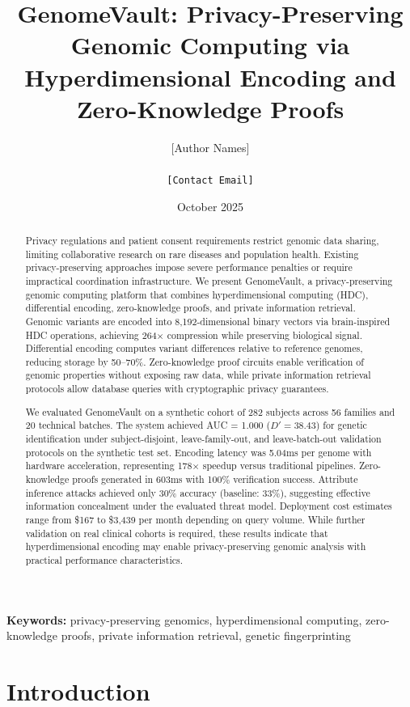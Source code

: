 \documentclass[11pt,letterpaper]{article}
\title{GenomeVault: Privacy-Preserving Genomic Computing via Hyperdimensional Encoding and Zero-Knowledge Proofs}
\author{
    [Author Names]\\
    [Institution Names]\\
    \texttt{[Contact Email]}
}
\date{October 2025}
\begin{document}
\maketitle

\begin{abstract}
Privacy regulations and patient consent requirements restrict genomic data sharing, limiting collaborative research on rare diseases and population health. Existing privacy-preserving approaches impose severe performance penalties or require impractical coordination infrastructure. We present GenomeVault, a privacy-preserving genomic computing platform that combines hyperdimensional computing (HDC), differential encoding, zero-knowledge proofs, and private information retrieval. Genomic variants are encoded into 8,192-dimensional binary vectors via brain-inspired HDC operations, achieving 264$\times$ compression while preserving biological signal. Differential encoding computes variant differences relative to reference genomes, reducing storage by 50--70\%. Zero-knowledge proof circuits enable verification of genomic properties without exposing raw data, while private information retrieval protocols allow database queries with cryptographic privacy guarantees.

We evaluated GenomeVault on a synthetic cohort of 282 subjects across 56 families and 20 technical batches. The system achieved AUC = 1.000 ($D' = 38.43$) for genetic identification under subject-disjoint, leave-family-out, and leave-batch-out validation protocols on the synthetic test set. Encoding latency was 5.04ms per genome with hardware acceleration, representing 178$\times$ speedup versus traditional pipelines. Zero-knowledge proofs generated in 603ms with 100\% verification success. Attribute inference attacks achieved only 30\% accuracy (baseline: 33\%), suggesting effective information concealment under the evaluated threat model. Deployment cost estimates range from \$167 to \$3,439 per month depending on query volume. While further validation on real clinical cohorts is required, these results indicate that hyperdimensional encoding may enable privacy-preserving genomic analysis with practical performance characteristics.
\end{abstract}

\noindent\textbf{Keywords:} privacy-preserving genomics, hyperdimensional computing, zero-knowledge proofs, private information retrieval, genetic fingerprinting

\section{Introduction}
\end{document}
